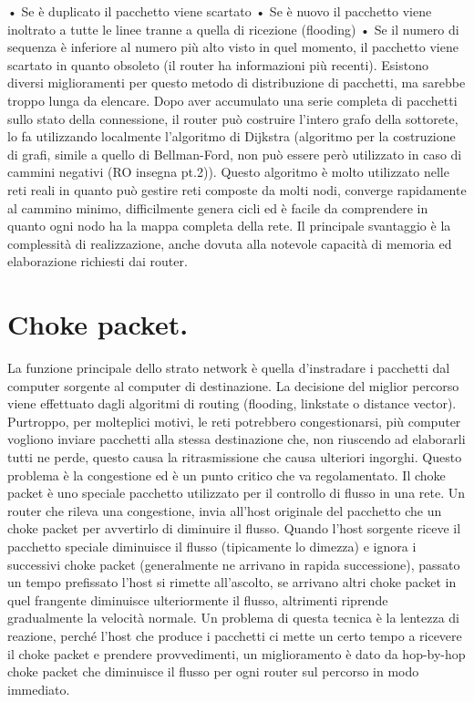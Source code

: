 •	Se è duplicato il pacchetto viene scartato
•	Se è nuovo il pacchetto viene inoltrato a tutte le linee tranne a quella di ricezione (flooding)
•	Se il numero di sequenza è inferiore al numero più alto visto in quel momento, il pacchetto viene scartato in quanto obsoleto (il router ha informazioni più recenti).
Esistono diversi miglioramenti per questo metodo di distribuzione di pacchetti, ma sarebbe troppo lunga da elencare.
Dopo aver accumulato una serie completa di pacchetti sullo stato della connessione, il router può costruire l’intero grafo della sottorete, lo fa utilizzando localmente l’algoritmo di Dijkstra (algoritmo per la costruzione di grafi, simile a quello di Bellman-Ford, non può essere però utilizzato in caso di cammini negativi (RO insegna pt.2)).
Questo algoritmo è molto utilizzato nelle reti reali in quanto può gestire reti composte da molti nodi, converge rapidamente al cammino minimo, difficilmente genera cicli ed è facile da comprendere in quanto ogni nodo ha la mappa completa della rete. Il principale svantaggio è la complessità di realizzazione, anche dovuta alla notevole capacità di memoria ed elaborazione richiesti dai router.
\section{Choke packet.}

La funzione principale dello strato network è quella d’instradare i pacchetti dal computer sorgente al computer di destinazione. La decisione del miglior percorso viene effettuato dagli algoritmi di routing (flooding, linkstate o distance vector). Purtroppo, per molteplici motivi, le reti potrebbero congestionarsi, più computer vogliono inviare pacchetti alla stessa destinazione che, non riuscendo ad elaborarli tutti ne perde, questo causa la ritrasmissione che causa ulteriori ingorghi. Questo problema è la congestione ed è un punto critico che va regolamentato.
Il choke packet è uno speciale pacchetto utilizzato per il controllo di flusso in una rete. Un router che rileva una congestione, invia all’host originale del pacchetto che un choke packet per avvertirlo di diminuire il flusso. Quando l’host sorgente riceve il pacchetto speciale diminuisce il flusso (tipicamente lo dimezza) e ignora i successivi choke packet (generalmente ne arrivano in rapida successione), passato un tempo prefissato l’host si rimette all’ascolto, se arrivano altri choke packet in quel frangente diminuisce ulteriormente il flusso, altrimenti riprende gradualmente la velocità normale.
Un problema di questa tecnica è la lentezza di reazione, perché l’host che produce i pacchetti ci mette un certo tempo a ricevere il choke packet e prendere provvedimenti, un miglioramento è dato da hop-by-hop choke packet che diminuisce il flusso per ogni router sul percorso in modo immediato.
 

